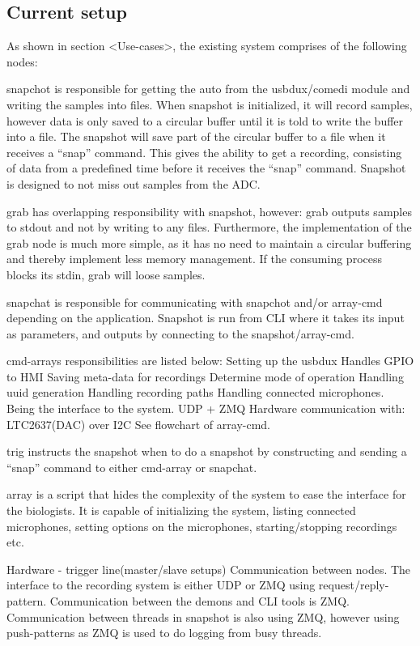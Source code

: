 
\subsection{Current setup}

As shown in section <Use-cases>, the existing system comprises of the following nodes:

snapchot is responsible for getting the auto from the usbdux/comedi module and writing the samples into files. When snapshot is initialized, it will record samples, however data is only saved to a circular buffer until it is told to write the buffer into a file. The snapshot will save part of the circular buffer to a file when it receives a “snap” command. This gives the ability to get a recording, consisting of data from a predefined time before it receives the “snap” command. Snapshot is designed to not miss out samples from the ADC.

grab has overlapping responsibility with snapshot, however: grab outputs samples to stdout and not by writing to any files. Furthermore, the implementation of the grab node is much more simple, as it has no need to maintain a circular buffering and thereby implement less memory management. If the consuming process blocks its stdin, grab will loose samples.

snapchat is responsible for communicating with snapchot and/or array-cmd depending on the application. Snapshot is run from CLI where it takes its input as parameters, and outputs by connecting to the snapshot/array-cmd.

cmd-arrays responsibilities are listed below:
Setting up the usbdux 
Handles GPIO to HMI
Saving meta-data for recordings
Determine mode of operation
Handling uuid generation
Handling recording paths
Handling connected microphones.
Being the interface to the system.
UDP + ZMQ
Hardware communication with:
LTC2637(DAC) over I2C
See flowchart of array-cmd.

trig instructs the snapshot when to do a snapshot by constructing and sending a “snap” command to either cmd-array or snapchat.

array is a script that hides the complexity of the system to ease the interface for the biologists. It is capable of initializing the system, listing connected microphones, setting options on the microphones, starting/stopping recordings etc.

Hardware - trigger line(master/slave setups)
Communication between nodes.
The interface to the recording system is either UDP or ZMQ using request/reply-pattern. Communication between the demons and CLI tools is ZMQ. Communication between threads in snapshot is also using ZMQ, however using push-patterns as ZMQ is used to do logging from busy threads.

